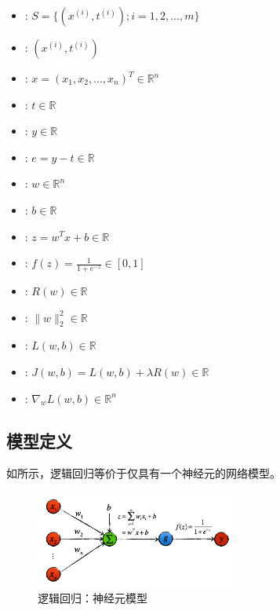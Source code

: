 \begin{content}
 \begin{itemize}
   \item {}: $ S = \{ ({x^{(i)}},{t^{(i)}});i = 1,2,...,m\} $
   \item {}: $ ({x^{(i)}},{t^{(i)}}) $
   \item {}: $ x = ({x_1},{x_2},...,{x_n})^{T}  \in {\mathbb{R}^n} $
   \item {}: $ t \in {\mathbb{R}} $
   \item {}: $ y \in {\mathbb{R}} $   
   \item {}: $ e = y - t \in {\mathbb{R}} $
   \item {}: $ w \in {\mathbb{R}^{n}} $   
   \item {}: $ b \in {\mathbb{R}} $
   \item {}: $ z = w^Tx + b \in {\mathbb{R}} $   
   \item {}: $ f(z) = \frac{1}{{1 + {e^{ - z}}}} \in {[0, 1]} $
   \item {}: $ R(w) \in {\mathbb{R}} $
   \item {}: $ \parallel w\parallel _2^2 \in {\mathbb{R}} $
   \item {}: $ L(w, b) \in {\mathbb{R}} $
   \item {}: $ J(w, b) = L(w, b) + \lambda R(w)\in {\mathbb{R}} $
   \item {}: $ {\nabla _w}L( {w,b}) \in {\mathbb{R}^n} $
 \end{itemize}

\subsection{模型定义}

如所示，逻辑回归等价于仅具有一个神经元的网络模型。

\begin{figure}[H]
\centering
\includegraphics[width=0.6\textwidth]{figures/logistic-regression-nn.png}
\caption{逻辑回归：神经元模型}
 \label{fig:logistic-regression-nn}
\end{figure}


\end{content}
